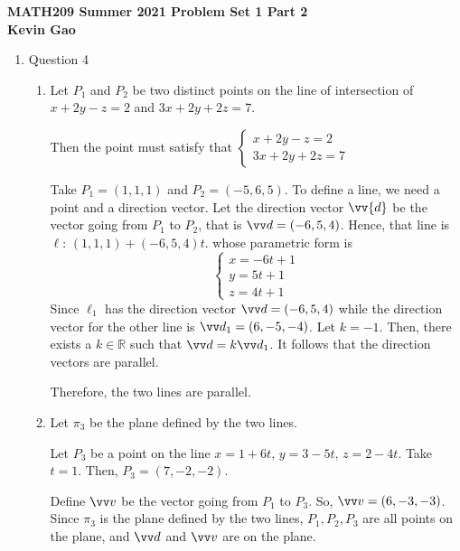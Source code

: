 \documentclass[11pt]{article}
\def\R {{\mathbb R}}
\begin{document}
\begin{center}

{\bf \Large \bf MATH209 Summer 2021 Problem Set 1 Part 2}\\
{\bf \large Kevin Gao}
\end{center}

\begin{enumerate}

    \item Question 4
    \begin{enumerate}
        \item
        Let $P_1$ and $P_2$ be two distinct points on the line of intersection of $x+2y-z=2$ and $3x+2y+2z=7$.
    
        Then the point must satisfy that
        $
        \begin{cases}
        x+2y-z=2 \\
        3x+2y+2z=7
        \end{cases}
        $
        
        Take $P_1 = (1,1,1)$ and $P_2=(-5,6,5)$. To define a line, we need a point and a direction vector. Let the direction vector $\vv{d}$ be the vector going from $P_1$ to $P_2$, that is $\vv d = (-6,5,4)$. Hence, that line is $\ell:\, (1,1,1) + (-6,5,4)t$. whose parametric form is
        $$
        \begin{cases}
        x = -6t+1 \\
        y = 5t+1 \\
        z = 4t+1
        \end{cases}
        $$
        Since $\ell_1$ has the direction vector $\vv d = (-6,5,4)$ while the direction vector for the other line is $\vv d_1 = (6,-5,-4)$. Let $k = -1$. Then, there exists a $k \in \R$ such that $\vv d = k\vv d_1$. It follows that the direction vectors are parallel.
        
        Therefore, the two lines are parallel.
        
        \item
        Let $\pi_3$ be the plane defined by the two lines.
    
        Let $P_3$ be a point on the line $x=1+6t,\, y=3-5t,\, z=2-4t$. Take $t=1$. Then, $P_3=(7,-2,-2)$.
        
        Define $\vv v$ be the vector going from $P_1$ to $P_3$. So, $\vv v = (6,-3,-3)$. Since $\pi_3$ is the plane defined by the two lines, $P_1,P_2,P_3$ are all points on the plane, and $\vv d$ and $\vv v$ are on the plane.
        

\end{enumerate}
\end{enumerate}
\end{document}
